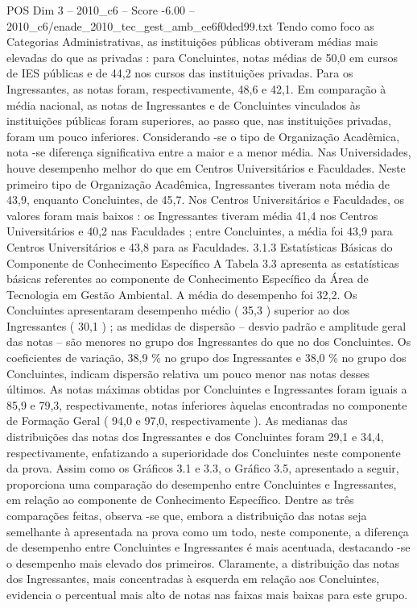 \begin{textsample}{POS Dim 3 – 2010\_c6 – Score -6.00 – 2010\_c6/enade\_2010\_tec\_gest\_amb\_ee6f0ded99.txt}
Tendo como foco as Categorias Administrativas, as instituições públicas obtiveram médias mais elevadas do que as privadas : para Concluintes, notas médias de 50,0 em cursos de IES públicas e de 44,2 nos cursos das instituições privadas.
Para os Ingressantes, as notas foram, respectivamente, 48,6 e 42,1.
Em comparação à média nacional, as notas de Ingressantes e de Concluintes vinculados às instituições públicas foram superiores, ao passo que, nas instituições privadas, foram um pouco inferiores.
Considerando -se o tipo de Organização Acadêmica, nota -se diferença significativa entre a maior e a menor média.
Nas Universidades, houve desempenho melhor do que em Centros Universitários e Faculdades.
Neste primeiro tipo de Organização Acadêmica, Ingressantes tiveram nota média de 43,9, enquanto Concluintes, de 45,7.
Nos Centros Universitários e Faculdades, os valores foram mais baixos : os Ingressantes tiveram média 41,4 nos Centros Universitários e 40,2 nas Faculdades ; entre Concluintes, a média foi 43,9 para Centros Universitários e 43,8 para as Faculdades. 3.1.3 Estatísticas Básicas do Componente de Conhecimento Específico A Tabela 3.3 apresenta as estatísticas básicas referentes ao componente de Conhecimento Específico da Área de Tecnologia em Gestão Ambiental.
A média do desempenho foi 32,2.
Os Concluintes apresentaram desempenho médio ( 35,3 ) superior ao dos Ingressantes ( 30,1 ) ; as medidas de dispersão – desvio padrão e amplitude geral das notas – são menores no grupo dos Ingressantes do que no dos Concluintes.
Os coeficientes de variação, 38,9 \% no grupo dos Ingressantes e 38,0 \% no grupo dos Concluintes, indicam dispersão relativa um pouco menor nas notas desses últimos.
As notas máximas obtidas por Concluintes e Ingressantes foram iguais a 85,9 e 79,3, respectivamente, notas inferiores àquelas encontradas no componente de Formação Geral ( 94,0 e 97,0, respectivamente ).
As medianas das distribuições das notas dos Ingressantes e dos Concluintes foram 29,1 e 34,4, respectivamente, enfatizando a superioridade dos Concluintes neste componente da prova.
Assim como os Gráficos 3.1 e 3.3, o Gráfico 3.5, apresentado a seguir, proporciona uma comparação do desempenho entre Concluintes e Ingressantes, em relação ao componente de Conhecimento Específico.
Dentre as três comparações feitas, observa -se que, embora a distribuição das notas seja semelhante à apresentada na prova como um todo, neste componente, a diferença de desempenho entre Concluintes e Ingressantes é mais acentuada, destacando -se o desempenho mais elevado dos primeiros.
Claramente, a distribuição das notas dos Ingressantes, mais concentradas à esquerda em relação aos Concluintes, evidencia o percentual mais alto de notas nas faixas mais baixas para este grupo.

\end{textsample}
